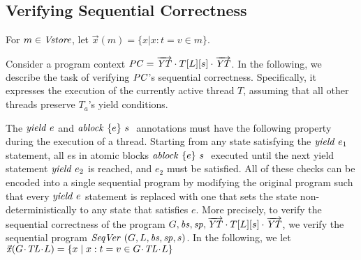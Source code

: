 \subsection{Verifying Sequential Correctness}
For $m \in \mathit{Vstore}$, let $ \vec{x}(m) = \{ x  |   x : t = v \in m \} $. 

Consider a program context $\mathit{PC} = \overrightarrow{\mathit{YT}} \cdot T[L][s] \cdot \overrightarrow{\mathit{YT}}$. In the following, we describe the task of verifying $\mathit{PC}$'s sequential correctness. Specifically, it expresses the execution of the currently active thread $T$, assuming that all other threads preserve $T_a$'s yield conditions.

The $\mathit{yield}\ e$ and $\mathit{ablock}\ {\{e\}}\ {s}\ $ annotations must have the following property during the execution of a thread. 
Starting from any state satisfying the $\mathit{yield}\ e_1$ statement, 
all $e$s in atomic blocks $\mathit{ablock}\ {\{e\}}\ {s}\ $ executed until the next yield statement $\mathit{yield}\ e_2$ is reached, and $e_2$ must be satisfied. 
All of these checks can be encoded into a single sequential program by modifying the original program such that every $\mathit{yield}\ e$ statement is replaced with one that sets the state non-deterministically to any state that satisfies $e$. 
More precisely, to verify the sequential correctness of the program $G, \mathit{bs}, \mathit{sp}, \overrightarrow{\mathit{YT}} \cdot T[L][s] \cdot \overrightarrow{\mathit{YT}}$, we verify the sequential program ${\mathit{SeqVer}\ }(G, L, \mathit{bs}, \mathit{sp}, s)$. 
In the following, we let $\xs(\vars) = \{x \mid x:t = v \in \vars\}$

